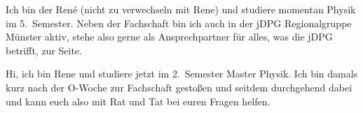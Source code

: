 \begin{multicols*}{2}
{Ich bin der René (nicht zu verwechseln mit Rene) und studiere momentan Physik im 5.~Semester.
	Neben der Fachschaft bin ich auch in der jDPG Regionalgruppe Münster aktiv, stehe also gerne als Ansprechpartner für alles, was die jDPG betrifft, zur Seite.
	\vspace{\baselineskip}}

{Hi, ich bin Rene und studiere jetzt im 2.~Semester Master Physik.
Ich bin damals kurz nach der O-Woche zur Fachschaft gestoßen und seitdem durchgehend dabei und kann euch also mit Rat und Tat bei euren Fragen helfen.}


\end{multicols*}
